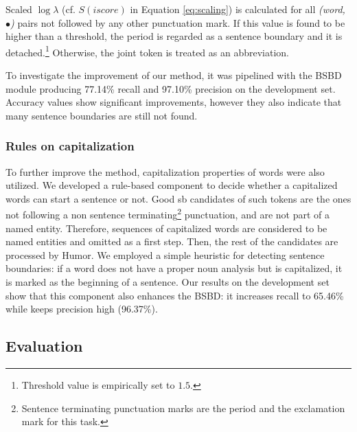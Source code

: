 Scaled $\log \lambda$ (cf. $S(iscore)$ in Equation \ref{eq:scaling}) is calculated for all \emph{(word, $\bullet$)} pairs not followed by any other punctuation mark. 
If this value is found to be higher than a threshold, the period is regarded as a sentence boundary and it is detached.\footnote{Threshold value is empirically set to $1.5$.} 
Otherwise, the joint token is treated as an abbreviation.

To investigate the improvement of our method, it was pipelined with the BSBD module producing 77.14\% recall and 97.10\% precision on the development set. 
Accuracy values show significant improvements, however they also indicate that many sentence boundaries are still not found.

\subsubsection{Rules on capitalization}

To further improve the method, capitalization properties of words were also utilized. 
We developed a rule-based component to decide whether a capitalized words can start a sentence or not.
Good \acrshort{sb} candidates of such tokens are the ones not following a non sentence terminating\footnote{Sentence terminating punctuation marks are the period and the exclamation mark for this task.} punctuation, and are not part of a named entity. 
Therefore, sequences of capitalized words are considered to be named entities and omitted as a first step. 
Then, the rest of the candidates are processed by Humor.
We employed a simple heuristic for detecting sentence boundaries:
if a word does not have a proper noun analysis but is capitalized, it is marked as the beginning of a sentence.  
Our results on the development set show that this component also enhances the BSBD: it increases recall to 65.46\% while keeps precision high (96.37\%). 

\subsection{Evaluation}


